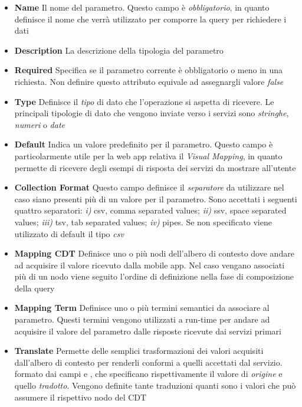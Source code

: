 \begin{itemize}
	\item \textbf{Name} Il nome del parametro. Questo campo è \emph{obbligatorio}, in quanto definisce il nome che verrà utilizzato per comporre la query per richiedere i dati
	\item \textbf{Description} La descrizione della tipologia del parametro
	\item \textbf{Required} Specifica se il parametro corrente è obbligatorio o meno in una richiesta. Non definire questo attributo equivale ad assegnargli valore \emph{false}
	\item \textbf{Type} Definisce il \emph{tipo} di dato che l'operazione si aspetta di ricevere. Le principali tipologie di dato che vengono inviate verso i servizi sono \emph{stringhe}, \emph{numeri} o \emph{date}
	\item \textbf{Default} Indica un valore predefinito per il parametro. Questo campo è particolarmente utile per la web app relativa il \emph{Visual Mapping}, in quanto permette di ricevere degli esempi di risposta dei servizi da mostrare all'utente
	\item \textbf{Collection Format} Questo campo definisce il \emph{separatore} da utilizzare nel caso siano presenti più di un valore per il parametro. Sono accettati i seguenti quattro separatori: \emph{i)} csv, comma separated values; \emph{ii)} ssv, space separated values; \emph{iii)} tsv, tab separated values; \emph{iv)} pipes. Se non specificato viene utilizzato di default il tipo \emph{csv}
	\item \textbf{Mapping CDT} Definisce uno o più nodi dell'albero di contesto dove andare ad acquisire il valore ricevuto dalla mobile app. Nel caso vengano associati più di un nodo viene seguito l'ordine di definizione nella fase di composizione della query
	\item \textbf{Mapping Term} Definisce uno o più termini semantici da associare al parametro. Questi termini vengono utilizzati a run-time per andare ad acquisire il valore del parametro dalle risposte ricevute dai servizi primari
	\item \textbf{Translate} Permette delle semplici trasformazioni dei valori acquisiti dall'albero di contesto per renderli conformi a quelli accettati dal servizio. \upe formato dai campi  e , che specificano rispettivamente il valore di \emph{origine} e quello \emph{tradotto}. Vengono definite tante traduzioni quanti sono i valori che può assumere il rispettivo nodo del CDT
\end{itemize}

